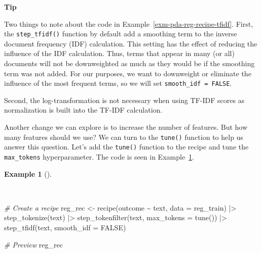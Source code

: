\documentclass[
  letterpaper,
  DIV=11,
  numbers=noendperiod]{scrreprt}
\newenvironment{Shaded}{\begin{snugshade}}{\end{snugshade}}
\newcommand{\AttributeTok}[1]{\textcolor[rgb]{0.00,0.00,0.00}{#1}}
\newcommand{\CommentTok}[1]{\textcolor[rgb]{0.00,0.00,0.00}{\textit{#1}}}
\newcommand{\ConstantTok}[1]{\textcolor[rgb]{0.00,0.00,0.00}{#1}}
\newcommand{\FunctionTok}[1]{\textcolor[rgb]{0.00,0.00,0.00}{#1}}
\newcommand{\NormalTok}[1]{\textcolor[rgb]{0.00,0.00,0.00}{#1}}
\newcommand{\OtherTok}[1]{\textcolor[rgb]{0.00,0.00,0.00}{#1}}
\newcommand{\SpecialCharTok}[1]{\textcolor[rgb]{0.00,0.00,0.00}{#1}}
\theoremstyle{definition}
\newtheorem{example}{Example}[chapter]
\theoremstyle{remark}
\begin{document}
\begin{tcolorbox}[enhanced jigsaw, leftrule=.75mm, colframe=quarto-callout-color-frame, colback=white, rightrule=.15mm, opacityback=0, arc=.35mm, breakable, bottomrule=.15mm, left=2mm, toprule=.15mm]

\textbf{ Tip}

Two things to note about the code in
Example~\ref{exm-pda-reg-recipe-tfidf}. First, the
\texttt{step\_tfidf()} function by default add a smoothing term to the
inverse document frequency (IDF) calculation. This setting has the
effect of reducing the influence of the IDF calculation. Thus, terms
that appear in many (or all) documents will not be downweighted as much
as they would be if the smoothing term was not added. For our purposes,
we want to downweight or eliminate the influence of the most frequent
terms, so we will set \texttt{smooth\_idf\ =\ FALSE}.

Second, the log-transformation is not necessary when using TF-IDF scores
as normalization is built into the TF-IDF calculation.

\end{tcolorbox}

Another change we can explore is to increase the number of features. But
how many features should we use? We can turn to the \texttt{tune()}
function to help us answer this question. Let's add the \texttt{tune()}
function to the recipe and tune the \texttt{max\_tokens} hyperparameter.
The code is seen in Example~\ref{exm-pda-reg-recipe-tune}.

\begin{example}[]\protect\hypertarget{exm-pda-reg-recipe-tune}{}\label{exm-pda-reg-recipe-tune}

~

\begin{Shaded}
\begin{Highlighting}[]
\CommentTok{\# Create a recipe}
\NormalTok{reg\_rec }\OtherTok{\textless{}{-}}
  \FunctionTok{recipe}\NormalTok{(outcome }\SpecialCharTok{\textasciitilde{}}\NormalTok{ text, }\AttributeTok{data =}\NormalTok{ reg\_train) }\SpecialCharTok{|\textgreater{}}
  \FunctionTok{step\_tokenize}\NormalTok{(text) }\SpecialCharTok{|\textgreater{}}
  \FunctionTok{step\_tokenfilter}\NormalTok{(text, }\AttributeTok{max\_tokens =} \FunctionTok{tune}\NormalTok{()) }\SpecialCharTok{|\textgreater{}}
  \FunctionTok{step\_tfidf}\NormalTok{(text, }\AttributeTok{smooth\_idf =} \ConstantTok{FALSE}\NormalTok{)}

\CommentTok{\# Preview}
\NormalTok{reg\_rec}
\end{Highlighting}
\end{Shaded}

\end{example}
\end{document}

